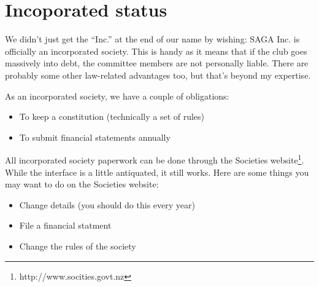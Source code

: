 \section{Incoporated status}

We didn't just get the ``Inc.'' at the end of our name by wishing: SAGA Inc. is officially an incorporated society. This is handy as it means that if the club goes massively into debt, the committee members are not personally liable. There are probably some other law-related advantages too, but that's beyond my expertise.

As an incorporated society, we have a couple of obligations:

\begin{itemize}
  \item To keep a constitution (technically a set of rules)
  \item To submit financial statements annually
\end{itemize}

All incorporated society paperwork can be done through the Societies website\footnote{http://www.socities.govt.nz}. While the interface is a little antiquated, it still works. Here are some things you may want to do on the Societies website:

\begin{itemize}
  \item Change details (you should do this every year)
  \item File a financial statment
  \item Change the rules of the society
\end{itemize}